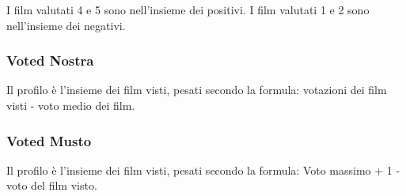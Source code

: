 I film valutati 4 e 5 sono nell'insieme dei positivi. I film valutati 1 e 2 sono nell'insieme dei negativi.


\subsubsection{Voted Nostra}


Il profilo è l'insieme dei film visti, pesati secondo la formula:
votazioni dei film visti - voto medio dei film.

\subsubsection{Voted Musto}

Il profilo è l'insieme dei film visti, pesati secondo la formula:
Voto massimo + 1 - voto del film visto. 

